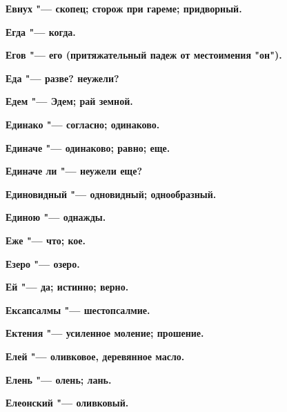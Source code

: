  





\bfseries Евнух \normalfont{} "--- скопец; сторож при гареме; придворный. 




\bfseries Егда \normalfont{} "--- когда. 




\bfseries Егов \normalfont{} "--- его (притяжательный падеж от местоимения "он"). 




\bfseries Еда \normalfont{} "--- разве? неужели? 




\bfseries Едем \normalfont{} "--- Эдем; рай земной. 




\bfseries Единако \normalfont{} "--- согласно; одинаково. 




\bfseries Единаче \normalfont{} "--- одинаково; равно; еще. 




\bfseries Единаче ли \normalfont{} "--- неужели еще? 




\bfseries Единовидный \normalfont{} "--- одновидный; однообразный. 




\bfseries Единою \normalfont{} "--- однажды. 




\bfseries Еже \normalfont{} "--- что; кое. 




\bfseries Езеро \normalfont{} "--- озеро. 




\bfseries Ей \normalfont{} "--- да; истинно; верно. 




\bfseries Ексапсалмы \normalfont{} "--- шестопсалмие. 




\bfseries Ектения \normalfont{} "--- усиленное моление; прошение. 




\bfseries Елей \normalfont{} "--- оливковое, деревянное масло. 




\bfseries Елень \normalfont{} "--- олень; лань. 




\bfseries Елеонский \normalfont{} "--- оливковый. 




